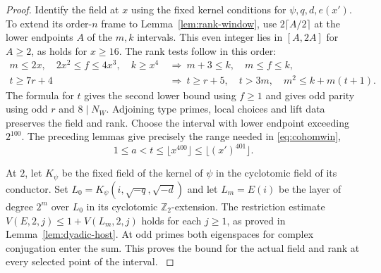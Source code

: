 \begin{proof}
Identify the field at \(x\) using the fixed kernel conditions
for \(\psi,q,d,e(x')\). To extend its order-\(n\) frame to
Lemma~\ref{lem:rank-window}, use \(2\lceil A/2\rceil\) at the
lower endpoints \(A\) of the \(m,k\) intervals. This even
integer lies in \([A,2A]\) for \(A\ge2\), as holds for \(x\ge16\).
The rank tests follow in this order:
\[
 \begin{aligned}
 m\le2x,\quad 2x^2\le f\le4x^3,\quad k\ge x^4
   &\ \Longrightarrow\ m+3\le k,\quad m\le f\le k,\\
 t\ge7r+4 &\ \Longrightarrow\ t\ge r+5,\quad t>3m,\quad
                                 m^2\le k+m(t+1).
 \end{aligned}
\]
The formula for \(t\) gives the second lower bound using \(f\ge1\)
and gives odd parity using odd \(r\) and \(8\mid N_W\). Adjoining
type primes, local choices and lift data preserves the field and
rank. Choose the interval with lower endpoint exceeding \(2^{100}\).
The preceding lemmas give precisely the range needed in \eqref{eq:cohomwin},
\[
             1\le a<t\le\lfloor x^{400}\rfloor
                          \le\lfloor(x')^{401}\rfloor .
\]

At \(2\), let \(K_\psi\) be the fixed
field of the kernel of \(\psi\) in the cyclotomic field of its
conductor. Set \(L_0=K_\psi(i,\sqrt{-q},\sqrt{-d})\) and let
\(L_m=E(i)\) be the layer of degree \(2^m\) over \(L_0\) in
its cyclotomic \(\mathbb Z_2\)-extension. The restriction
estimate \(V(E,2,j)\le 1+V(L_m,2,j)\) holds for each
\(j\ge1\), as proved in Lemma~\ref{lem:dyadic-host}.
At odd primes both eigenspaces for complex conjugation
enter the sum. This proves the bound for the actual field
and rank at every selected point of the interval.
\label{cor:family-window-1}

\end{proof}

